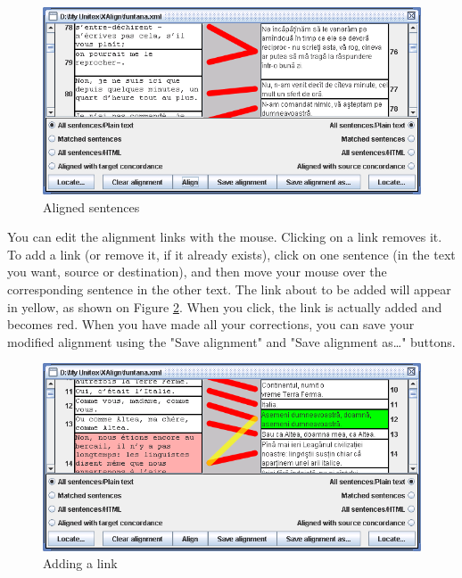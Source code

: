 \begin{figure}[!ht]
\begin{center}
\includegraphics[width=15.5cm]{resources/img/figX-4.png}
\caption{Aligned sentences\label{fig-x-links}}
\end{center}
\end{figure}

\bigskip
\noindent You can edit the alignment links with the mouse. Clicking on a link
removes it. To add a link (or remove it, if it already exists), click on one
sentence (in the text you want, source or destination), and then move your mouse
over the corresponding sentence in the other text. The link about to be added
will appear in yellow, as shown on Figure \ref{fig-x-adding-a-link}. When you
click, the link is actually added and becomes red. When you have made all your
corrections, you can save your modified alignment using the "Save alignment"
and "Save alignment as\ldots" buttons.

\begin{figure}[!ht]
\begin{center}
\includegraphics[width=15.5cm]{resources/img/figX-5.png}
\caption{Adding a link\label{fig-x-adding-a-link}}
\end{center}
\end{figure}

